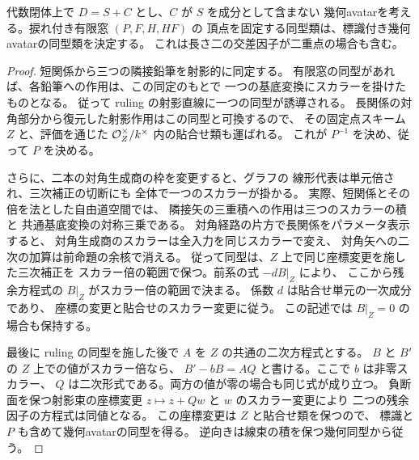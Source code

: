\begin{theorem}[負断面境界における幾何avatarの有限窓からの復元]
\label{thm:qa-avatar-deep-reconstruction}
代数閉体上で $D=S+C$ とし、$C$ が $S$ を成分として含まない
幾何avatarを考える。捩れ付き有限窓 $(P,F,H,HF)$ の
頂点を固定する同型類は、標識付き幾何avatarの同型類を決定する。
これは長さ二の交差因子が二重点の場合も含む。
\end{theorem}
\begin{proof}
短関係から三つの隣接鉛筆を射影的に同定する。
有限窓の同型があれば、各鉛筆への作用は、この同定のもとで
一つの基底変換にスカラーを掛けたものとなる。
従って ruling の射影直線に一つの同型が誘導される。
長関係の対角部分から復元した射影作用はこの同型と可換するので、
その固定点スキーム $Z$ と、評価を通じた
$\mathcal O_Z^\times/k^\times$ 内の貼合せ類も運ばれる。
これが $P^{-1}$ を決め、従って $P$ を決める。

さらに、二本の対角生成商の枠を変更すると、グラフの
線形代表は単元倍され、三次補正の切断にも
全体で一つのスカラーが掛かる。
実際、短関係とその倍を法とした自由道空間では、
隣接矢の三重積への作用は三つのスカラーの積と
共通基底変換の対称三乗である。
対角経路の片方で長関係をパラメータ表示すると、
対角生成商のスカラーは全入力を同じスカラーで変え、
対角矢への二次の加算は前命題の余核で消える。
従って同型は、$Z$ 上で同じ座標変更を施した三次補正を
スカラー倍の範囲で保つ。前系の式 $-dB|_Z$ により、
ここから残余方程式の $B|_Z$ がスカラー倍の範囲で決まる。
係数 $d$ は貼合せ単元の一次成分であり、
座標の変更と貼合せのスカラー変更に従う。
この記述では $B|_Z=0$ の場合も保持する。

最後に ruling の同型を施した後で
$A$ を $Z$ の共通の二次方程式とする。
$B$ と $B'$ の $Z$ 上での値がスカラー倍なら、
$B'-bB=AQ$ と書ける。ここで $b$ は非零スカラー、
$Q$ は二次形式である。両方の値が零の場合も同じ式が成り立つ。
負断面を保つ射影束の座標変更
$z\mapsto z+Qw$ と $w$ のスカラー変更により
二つの残余因子の方程式は同値となる。
この座標変更は $Z$ と貼合せ類を保つので、
標識と $P$ も含めて幾何avatarの同型を得る。
逆向きは線束の積を保つ幾何同型から従う。
\end{proof}

